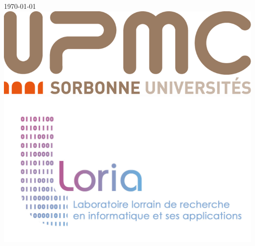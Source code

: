 \documentclass[a4paper,12pt]{article}
\begin{document}
\begin{titlepage}


{\large \today}\\[3cm] %


\includegraphics[scale=0.2]{Pictures/png/UPMC_sorbonne.png}\hspace{3cm}
\includegraphics[scale=0.1]{Pictures/loria_logo.jpg}


\vfill %
\end{titlepage}
\clearpage
\end{document}
